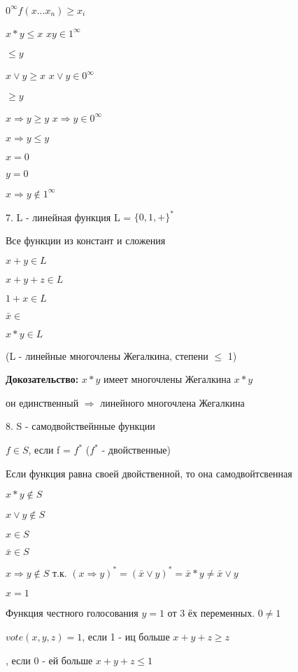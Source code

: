 \documentclass[russian]{lecture-notes}
\begin{document}
	\qquad $0^{\infty} f(x...x_{n}) \geqslant x_{i}$

	$x*y \leqslant x$ \qquad $xy \in 1^{\infty}$

	\quad $\leqslant y$

	$x \lor y \geqslant x$ \qquad $x \lor y \in 0^{\infty}$

	\quad $\geqslant y$

	$x \Rightarrow y \geqslant y$ \quad $x \Rightarrow y \in 0^{\infty} $

	$x \Rightarrow y \leqslant y $

	\qquad $x=0$

	\qquad $y=0$

	$x \Rightarrow y \notin 1^{\infty}$

	7. L - линейная функция L = $\{0,1,+\}^{*}$

	Все функции из констант и сложения

	$x+y \in L$

	$x+y + z \in L$

	$1+x \in L$

	$\bar{x} \in$

	$x * y \in L$

	(L - линейные многочлены Жегалкина, степени $\leqslant$ 1)

	\textbf{Докозательство: } $ x * y$ имеет многочлены Жегалкина $x*y$

	он единственный $\Rightarrow $ линейного многочлена Жегалкина %

	8. S - самодвойствейнные функции

	$f \in S$, если f = $f^{*}$ \quad ($f^{*} $ - двойственные)

	Если функция равна своей двойственной, то она самодвойтсвенная

	\begin{example}
		$x*y \notin S$

		$x \lor y \notin S$

		$x \in S$

		$\bar{x} \in S$

		$x \Rightarrow y \notin S $ т.к. $(x \Rightarrow y)^{*} = (\bar{x} \lor y)^{*} = \bar{x}*y \neq \bar{x} \lor y$

		$x = 1$
		\end{example}
	Функция честного голосования $y = 1$ от 3 ёх переменных. $0 \neq 1$

	$vote(x,y,z) = 1$,  если 1 - иц больше $x + y + z \geq z$

	 \qquad \quad \quad \quad \quad {}, если 0 - ей больше $x + y + z \leq 1$
\end{document}
